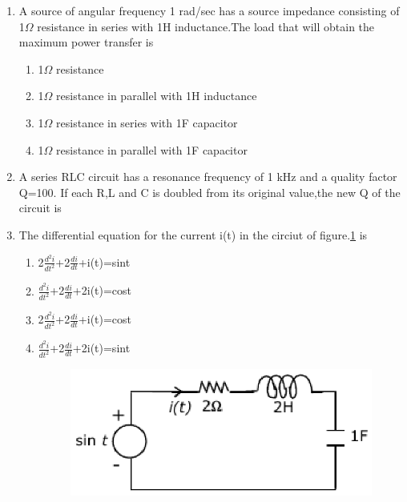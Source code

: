 \documentclass[journal,12pt,twocolumn]{IEEEtran}
\begin{document}
\begin{enumerate}
\item A source of angular frequency 1 rad/sec has a source impedance consisting of 1$\Omega$ resistance in series with 1H inductance.The load that will obtain the maximum power transfer is
\begin{enumerate}
\setlength\itemsep{2em}
\item 1$\Omega$ resistance
\item 1$\Omega$ resistance in parallel with 1H inductance
\item 1$\Omega$ resistance in series with 1F capacitor
\item 1$\Omega$ resistance in parallel with 1F capacitor
\end{enumerate}

\item A series RLC circuit has a resonance frequency of 1 kHz and a quality factor Q=100. If each R,L and C is doubled from its original value,the new Q of the circuit  is
\begin{enumerate}
\setlength\itemsep{2em}
\end{enumerate}

\item The differential equation for the current i(t) in the circiut of figure.\ref{fig48} is
\begin{enumerate}
\setlength\itemsep{2em}
\item 2$\frac{d^{2}i}{dt^{2}}$+2$\frac{di}{dt}$+i(t)=sint
\item $\frac{d^{2}i}{dt^{2}}$+2$\frac{di}{dt}$+2i(t)=cost
\item 2$\frac{d^{2}i}{dt^{2}}$+2$\frac{di}{dt}$+i(t)=cost
\item $\frac{d^{2}i}{dt^{2}}$+2$\frac{di}{dt}$+2i(t)=sint
\begin{figure}[!h]
\begin{center}
\includegraphics[scale=0.7]{./figs/fig48.eps}
\caption{}
\label{fig48}
\end{center}
\end{figure}
\end{enumerate}


\end{enumerate}
\end{document}
